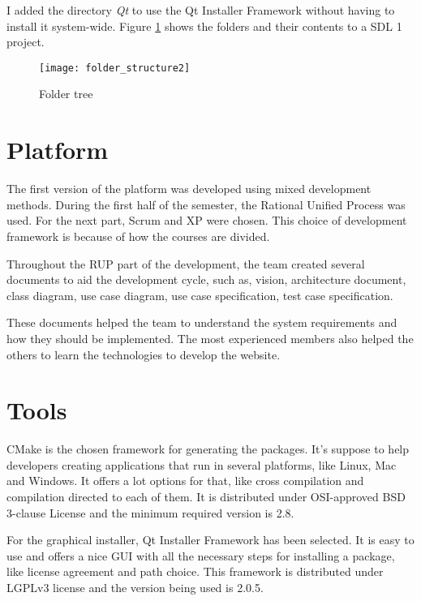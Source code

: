 I added the directory \textit{Qt} to use the Qt Installer Framework without having to install it system-wide. Figure \ref{fig:folder_structure} shows the folders and their contents to a SDL 1 project.

\begin{figure}[h!]
\centering
\texttt{[image: folder\_structure2]}
\caption{Folder tree}
\label{fig:folder_structure}
\end{figure}

\section{Platform}
\label{sec:platform}

The first version of the platform was developed using mixed development methods. During the first half of the semester, the Rational Unified Process was used. For the next part, Scrum and XP were chosen. This choice of development framework is because of how the courses are divided.

Throughout the RUP part of the development, the team created several documents to aid the development cycle, such as, vision, architecture document, class diagram, use case diagram, use case specification, test case specification.

These documents helped the team to understand the system requirements and how they should be implemented. The most experienced members also helped the others to learn the technologies to develop the website.


\section{Tools}
\label{sec:tools}

CMake is the chosen framework for generating the packages. It's suppose to help developers creating applications that run in several platforms, like Linux, Mac and Windows. It offers a lot options for that, like cross compilation and compilation directed to each of them. It is distributed under OSI-approved BSD 3-clause License and the minimum required version is 2.8.

For the graphical installer, Qt Installer Framework has been selected. It is easy to use and offers a nice GUI with all the necessary steps for installing a package, like license agreement and path choice. This framework is distributed under LGPLv3 license and the version being used is 2.0.5.

